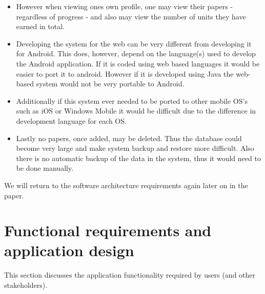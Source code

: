 \documentclass[a4paper,12pt]{article}
\begin{document}
\begin{itemize}
\item However when viewing ones own profile, one may view their papers - regardless of progress - and also may view the number of units they have earned in total. 
\item Developing the system for the web can be very different from developing it for Android. This does, however, depend on the language(s) used to develop the Android application. If it is coded using web based languages it would be easier to port it to android. However if it is developed using Java the web-based system would not be very portable to Android. 
\item Additionally if this system ever needed to be ported to other mobile OS's such as iOS or Windows Mobile it would be difficult due to the difference in development language for each OS.
\item Lastly no papers, once added, may be deleted. Thus the database could become very large and make system backup and restore more difficult. Also there is no automatic backup of the data in the system, thus it would need to be done manually. 
\end{itemize}

We will return to the software architecture requirements again later on in the paper. 

\newpage
\section{Functional requirements and application design}
This section discusses the application functionality required by users (and other stakeholders).

\end{document}
